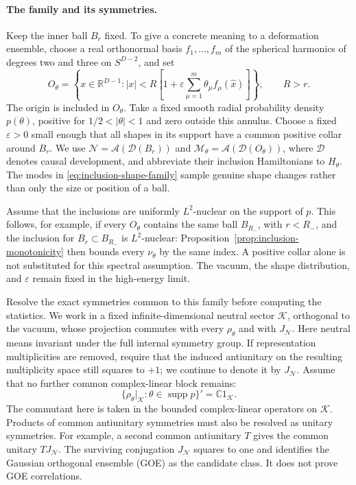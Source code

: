 \documentclass[a4paper,11pt]{article}
\theoremstyle{definition}
\begin{document}
\paragraph{The family and its symmetries.}
Keep the inner ball $B_r$ fixed. To give a concrete meaning to a deformation ensemble, choose a real orthonormal basis $f_1,\ldots,f_m$ of the spherical harmonics of degrees two and three on $S^{D-2}$, and set
\begin{equation}
 O_\theta=\left\{x\in\mathbb R^{D-1}:
 |x|<R\left[1+\varepsilon\sum_{\mu=1}^m
             \theta_\mu f_\mu(\widehat x)\right]\right\},
 \qquad R>r.
 \label{eq:inclusion-shape-family}
\end{equation}
The origin is included in $O_\theta$. Take a fixed smooth radial probability density $p(\theta)$, positive for $1/2<|\theta|<1$ and zero outside this annulus. Choose a fixed $\varepsilon>0$ small enough that all shapes in its support have a common positive collar around $B_r$. We use
$\mathcal N=\mathcal A(\mathcal D(B_r))$ and
$\mathcal M_\theta=\mathcal A(\mathcal D(O_\theta))$,
where $\mathcal D$ denotes causal development, and abbreviate their inclusion Hamiltonians to $H_\theta$. The modes in \eqref{eq:inclusion-shape-family} sample genuine shape changes rather than only the size or position of a ball.

Assume that the inclusions are uniformly $L^2$-nuclear on the support of $p$. This follows, for example, if every $O_\theta$ contains the same ball $B_{R_-}$, with $r<R_-$, and the inclusion for $B_r\subset B_{R_-}$ is $L^2$-nuclear: Proposition~\ref{prop:inclusion-monotonicity} then bounds every $\nu_\theta$ by the same index. A positive collar alone is not substituted for this spectral assumption. The vacuum, the shape distribution, and $\varepsilon$ remain fixed in the high-energy limit.

Resolve the exact symmetries common to this family before computing the statistics. We work in a fixed infinite-dimensional neutral sector $\mathcal K$, orthogonal to the vacuum, whose projection commutes with every $\rho_\theta$ and with $J_{\mathcal N}$. Here neutral means invariant under the full internal symmetry group. If representation multiplicities are removed, require that the induced antiunitary on the resulting multiplicity space still squares to $+1$; we continue to denote it by $J_{\mathcal N}$. Assume that no further common complex-linear block remains:
\begin{equation}
 \bigl\{\rho_\theta|_{\mathcal K}:\theta\in\operatorname{supp}p\bigr\}'
   =\mathbb C1_{\mathcal K}.
 \label{eq:inclusion-common-sector}
\end{equation}
The commutant here is taken in the bounded complex-linear operators on $\mathcal K$. Products of common antiunitary symmetries must also be resolved as unitary symmetries. For example, a second common antiunitary $T$ gives the common unitary $TJ_{\mathcal N}$. The surviving conjugation $J_{\mathcal N}$ squares to one and identifies the Gaussian orthogonal ensemble (GOE) as the candidate class. It does not prove GOE correlations.
\end{document}
